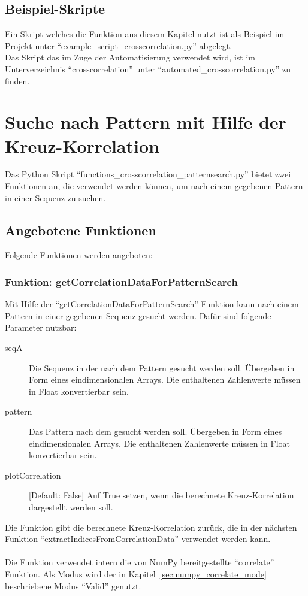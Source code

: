 \section{Beispiel-Skripte}
Ein Skript welches die Funktion aus diesem Kapitel nutzt ist als Beispiel im Projekt unter \enquote{example\_script\_crosscorrelation.py} abgelegt.\\
Das Skript das im Zuge der Automatisierung verwendet wird, ist im Unterverzeichnis \enquote{crosscorrelation} unter \enquote{automated\_crosscorrelation.py} zu finden.









\chapter{Suche nach Pattern mit Hilfe der Kreuz-Korrelation}
\label{chp:crosscorrelation:patternsearch}
Das Python Skript \enquote{functions\_crosscorrelation\_patternsearch.py} bietet zwei Funktionen an, die verwendet werden können, 
um nach einem gegebenen Pattern in einer Sequenz zu suchen.

\section{Angebotene Funktionen}
Folgende Funktionen werden angeboten:

\subsection{Funktion: getCorrelationDataForPatternSearch}
Mit Hilfe der \enquote{getCorrelationDataForPatternSearch} Funktion kann nach einem Pattern in einer gegebenen Sequenz gesucht werden. Dafür sind folgende Parameter nutzbar:
\begin{description}
    \item[seqA] Die Sequenz in der nach dem Pattern gesucht werden soll. Übergeben in Form eines eindimensionalen Arrays. Die enthaltenen Zahlenwerte müssen in Float konvertierbar sein.
    \item[pattern] Das Pattern nach dem gesucht werden soll. Übergeben in Form eines eindimensionalen Arrays. Die enthaltenen Zahlenwerte müssen in Float konvertierbar sein.
    \item[plotCorrelation] [Default: False] Auf True setzen, wenn die berechnete Kreuz-Korrelation dargestellt werden soll.
\end{description}
Die Funktion gibt die berechnete Kreuz-Korrelation zurück, die in der nächsten Funktion \enquote{extractIndicesFromCorrelationData} verwendet werden kann.
\\
\\
Die Funktion verwendet intern die von NumPy bereitgestellte \enquote{correlate} Funktion. Als Modus wird der in Kapitel~\ref{sec:numpy_correlate_mode} beschriebene Modus \enquote{Valid} genutzt.

